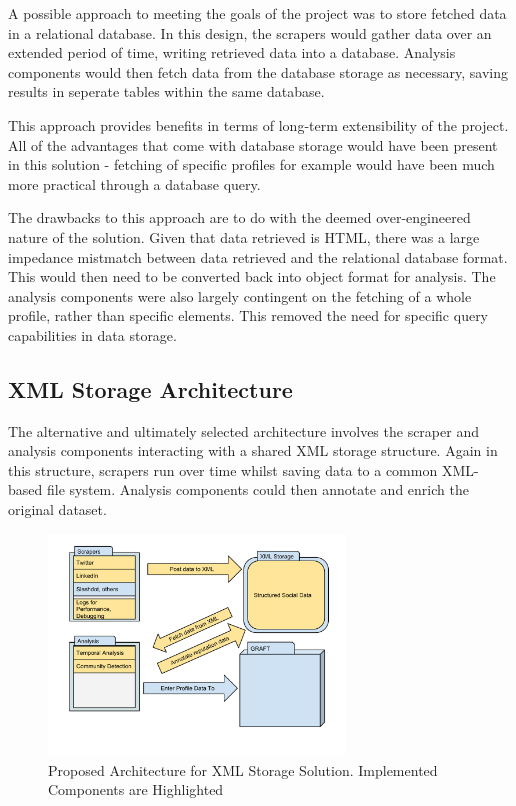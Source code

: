 A possible approach to meeting the goals of the project was to store fetched data in a relational database. In this design, the scrapers would gather data over an extended period of time, writing retrieved data into a database. Analysis components would then fetch data from the database storage as necessary, saving results in seperate tables within the same database.

This approach provides benefits in terms of long-term extensibility of the project. All of the advantages that come with database storage would have been present in this solution - fetching of specific profiles for example would have been much more practical through a database query. 

The drawbacks to this approach are to do with the deemed over-engineered nature of the solution. Given that data retrieved is HTML, there was a large impedance mistmatch between data retrieved and the relational database format. This would then need to be converted back into object format for analysis. The analysis components were also largely contingent on the fetching of a whole profile, rather than specific elements. This removed the need for specific query capabilities in data storage.



\subsection{XML Storage Architecture}

The alternative and ultimately selected architecture involves the scraper and analysis components interacting with a shared XML storage structure. Again in this structure, scrapers run over time whilst saving data to a common XML-based file system. Analysis components could then annotate and enrich the original dataset. 

\begin{figure}[h!]
\centering
\includegraphics[width=0.7\textwidth]{Images/XML_Storage_Architecture.pdf}
\caption{Proposed Architecture for XML Storage Solution. Implemented Components are Highlighted}
\end{figure}

